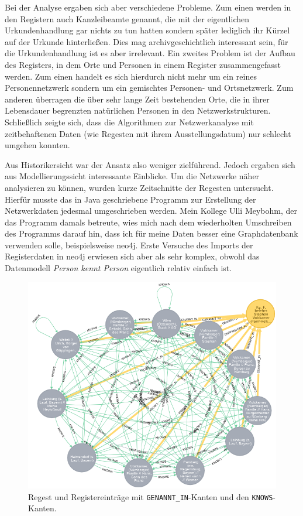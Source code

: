 \documentclass[ngerman,]{scrreprt}
\begin{document}
Bei der Analyse ergaben sich aber verschiedene Probleme. Zum einen werden in den Registern auch Kanzleibeamte genannt, die mit der eigentlichen Urkundenhandlung gar nichts zu tun hatten sondern später lediglich ihr Kürzel auf der Urkunde hinterließen. Dies mag archivgeschichtlich interessant sein, für die Urkundenhandlung ist es aber irrelevant. Ein zweites Problem ist der Aufbau des Registers, in dem Orte und Personen in einem Register zusammengefasst werden. Zum einen handelt es sich hierdurch nicht mehr um ein reines Personennetzwerk sondern um ein gemischtes Personen- und Ortsnetzwerk. Zum anderen überragen die über sehr lange Zeit bestehenden Orte, die in ihrer Lebensdauer begrenzten natürlichen Personen in den Netzwerkstrukturen. Schließlich zeigte sich, dass die Algorithmen zur Netzwerkanalyse mit zeitbehaftenen Daten (wie Regesten mit ihrem Ausstellungsdatum) nur schlecht umgehen konnten.

Aus Historikersicht war der Ansatz also weniger zielführend. Jedoch ergaben sich aus Modellierungssicht interessante Einblicke. Um die Netzwerke näher analysieren zu können, wurden kurze Zeitschnitte der Regesten untersucht. Hierfür musste das in Java geschriebene Programm zur Erstellung der Netzwerkdaten jedesmal umgeschrieben werden. Mein Kollege Ulli Meybohm, der das Programm damals betreute, wies mich nach dem wiederholten Umschreiben des Programms darauf hin, dass ich für meine Daten besser eine Graphdatenbank verwenden solle, beispielsweise neo4j. Erste Versuche des Imports der Registerdaten in neo4j erwiesen sich aber als sehr komplex, obwohl das Datenmodell \emph{Person kennt Person} eigentlich relativ einfach ist.

\begin{figure}
\centering
\includegraphics{Bilder/1zu1-Beziehungen-Register-Regest.png}
\caption{Regest und Registereinträge mit \texttt{GENANNT\_IN}-Kanten und den \texttt{KNOWS}-Kanten.}
\end{figure}
\end{document}
